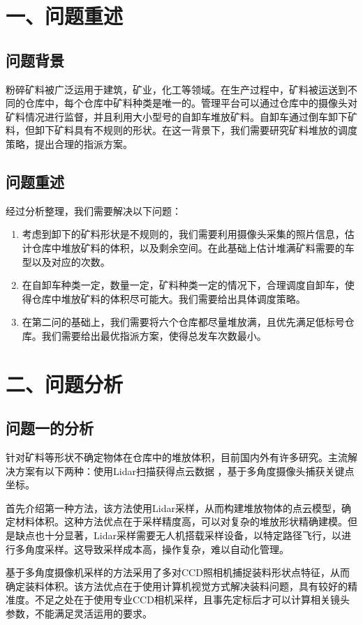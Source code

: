 \documentclass{my_paper}
\begin{document}
\section{一、问题重述}

\subsection{问题背景}
粉碎矿料被广泛运用于建筑，矿业，化工等领域。在生产过程中，矿料被运送到不同的仓库中，每个仓库中矿料种类是唯一的。管理平台可以通过仓库中的摄像头对矿料情况进行监督，并且利用大小型号的自卸车堆放矿料。自卸车通过倒车卸下矿料，但卸下矿料具有不规则的形状。在这一背景下，我们需要研究矿料堆放的调度策略，提出合理的指派方案。

\subsection{问题重述}
经过分析整理，我们需要解决以下问题：
\begin{enumerate}
    \item 考虑到卸下的矿料形状是不规则的，我们需要利用摄像头采集的照片信息，估计仓库中堆放矿料的体积，以及剩余空间。在此基础上估计堆满矿料需要的车型以及对应的次数。
    \item 在自卸车种类一定，数量一定，矿料种类一定的情况下，合理调度自卸车，使得仓库中堆放矿料的体积尽可能大。我们需要给出具体调度策略。
    \item 在第二问的基础上，我们需要将六个仓库都尽量堆放满，且优先满足低标号仓库。我们需要给出最优指派方案，使得总发车次数最小。
\end{enumerate}
\section{二、问题分析}
\subsection{问题一的分析}

针对矿料等形状不确定物体在仓库中的堆放体积，目前国内外有许多研究。主流解决方案有以下两种：使用Lidar扫描获得点云数据\cite{UAV} ，基于多角度摄像头捕获关键点坐标\cite{camera}。

首先介绍第一种方法，该方法使用Lidar采样，从而构建堆放物体的点云模型，确定材料体积。这种方法优点在于采样精度高，可以对复杂的堆放形状精确建模。但是缺点也十分显著，Lidar采样需要无人机搭载采样设备，以特定路径飞行，以进行多角度采样。这导致采样成本高，操作复杂，难以自动化管理。

基于多角度摄像机采样的方法采用了多对CCD照相机捕捉装料形状点特征，从而确定装料体积。该方法优点在于使用计算机视觉方式解决装料问题，具有较好的精准度。不足之处在于使用专业CCD相机采样，且事先定标后才可以计算相关镜头参数，不能满足灵活运用的要求。
\end{document}
